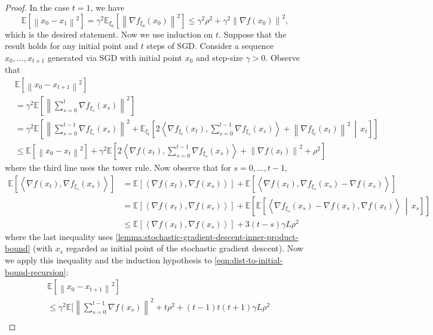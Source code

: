 \documentclass{article}
\newcommand{\inprod}[2]{\left\langle #1,#2 \right\rangle}
\newcommand{\sqnorm}[1]{\left\| #1 \right\|^2}
\theoremstyle{plain}
\theoremstyle{remark}
\begin{document}
\begin{proof}
In the case $t=1$, we have 
\[
    \mathbb{E} \left[ \sqnorm{x_0 - x_1} \right] = \gamma^2 \mathbb{E}_{\xi_0} \left[ \sqnorm{\nabla f_{\xi_0} (x_0)} \right] \le \gamma^2 \rho^2 + \gamma^2 \sqnorm{\nabla f(x_0)} ,
\]
which is the desired statement.
Now we use induction on $t$.
Suppose that the result holds for any initial point and $t$ steps of SGD.
Consider a sequence $x_0, \dots, x_{t+1}$ generated via SGD with initial point $x_0$ and step-size $\gamma > 0$.
Observe that
\begin{align}
    & \mathbb{E} \left[ \sqnorm{x_0 - x_{t+1}} \right] \nonumber \\
    & = \gamma^2 \mathbb{E} \left[ \sqnorm{\sum_{s=0}^{t} \nabla f_{\xi_s} (x_s)} \right] \nonumber \\
    & = \gamma^2 \mathbb{E} \left[ \sqnorm{\sum_{s=0}^{t-1} \nabla f_{\xi_s} (x_s)} + \mathbb{E}_{\xi_t} \left[ 2\inprod{\nabla f_{\xi_t}(x_t)}{\sum_{s=0}^{t-1} \nabla f_{\xi_s} (x_s)} +\sqnorm{\nabla f_{\xi_t}(x_t)}   \,\middle|\, x_t \right] \right] \nonumber \\
    & \le \mathbb{E} \left[ \sqnorm{x_0 - x_t} \right]  + \gamma^2 \mathbb{E} \left[  2\inprod{\nabla f(x_t)}{\sum_{s=0}^{t-1} \nabla f_{\xi_s} (x_s)} + \sqnorm{\nabla f(x_t)} + \rho^2 \right] \label{eqn:dist-to-initial-bound-recursion}
\end{align}
where the third line uses the tower rule.
Now observe that for $s=0,\dots,t-1$,
\begin{align*}
    \mathbb{E} \left[ \inprod{\nabla f(x_t)}{\nabla f_{\xi_s}(x_s)} \right] & = \mathbb{E} \left[ \inprod{\nabla f(x_t)}{\nabla f(x_s)} \right] + \mathbb{E} \left[ \inprod{\nabla f(x_t)}{\nabla f_{\xi_s}(x_s) - \nabla f(x_s)} \right] \\
    & = \mathbb{E} \left[ \inprod{\nabla f(x_t)}{\nabla f(x_s)} \right] + \mathbb{E} \left[ \mathbb{E} \left[ \inprod{\nabla f_{\xi_s}(x_s) - \nabla f(x_s)}{\nabla f(x_t)} \,\middle|\, x_s \right] \right] \\
    & \le \mathbb{E} \left[ \inprod{\nabla f(x_t)}{\nabla f(x_s)} \right] + 3(t-s) \gamma L \rho^2
\end{align*}
where the last inequality uses \cref{lemma:stochastic-gradient-descent-inner-product-bound} (with $x_s$ regarded as initial point of the stochastic gradient descent).
Now we apply this inequality and the induction hypothesis to \eqref{eqn:dist-to-initial-bound-recursion}:
\begin{align*}
    & \mathbb{E}\left[ \sqnorm{x_0 - x_{t+1}} \right] \\ & \le \gamma^2 \mathbb{E} \Bigg[ \sqnorm{\sum_{s=0}^{t-1} \nabla f(x_s)} + t \rho^2 + (t-1)t(t+1) \gamma L \rho^2 \\

\end{align*}
\end{proof}
\end{document}
